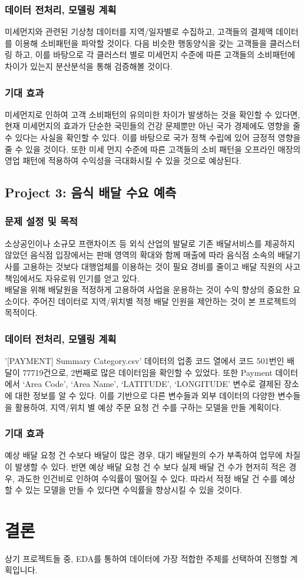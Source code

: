 \documentclass[11pt]{article}
\begin{document}
\subsubsection{데이터 전처리, 모델링 계획}
미세먼지와 관련된 기상청 데이터를 지역/일자별로 수집하고, 고객들의 결제액 데이터를 이용해 소비패턴을 파악할 것이다. 다음 비슷한 행동양식을 갖는 고객들을 클러스터링 하고, 이를 바탕으로 각 클러스터 별로 미세먼지 수준에 따른 고객들의 소비패턴에 차이가 있는지 분산분석을 통해 검증해볼 것이다.
\subsubsection{기대 효과}
미세먼지로 인하여 고객 소비패턴의 유의미한 차이가 발생하는 것을 확인할 수 있다면, 현재 미세먼지의 효과가 단순한 국민들의 건강 문제뿐만 아닌 국가 경제에도 영향을 줄 수 있다는 사실을 확인할 수 있다. 이를 바탕으로 국가 정책 수립에 있어 긍정적 영향을 줄 수 있을 것이다.
또한 미세 먼지 수준에 따른 고객들의 소비 패턴을 오프라인 매장의 영업 패턴에 적용하여 수익성을 극대화시킬 수 있을 것으로 예상된다.

\subsection{Project 3: 음식 배달 수요 예측}
\subsubsection{문제 설정 및 목적}
소상공인이나 소규모 프랜차이즈 등 외식 산업의 발달로 기존 배달서비스를 제공하지 않았던 음식점 입장에서는 판매 영역의 확대와 함께 매출에 따라 음식점 소속의 배달기사를 고용하는 것보다 대행업체를 이용하는 것이 필요 경비를 줄이고 배달 직원의 사고 책임에서도 자유로워 인기를 얻고 있다.\\
배달을 위해 배달원을 적정하게 고용하여 사업을 운용하는 것이 수익 향상의 중요한 요소이다. 주어진 데이터로 지역/위치별 적정 배달 인원을 제안하는 것이 본 프로젝트의 목적이다.
\subsubsection{데이터 전처리, 모델링 계획}
'[PAYMENT] Summary Category.csv’ 데이터의 업종 코드 열에서 코드 501번인 배달이 77719건으로, 2번째로 많은 데이터임을 확인할 수 있었다. 또한 Payment 데이터에서 ‘Area Code’, ‘Area Name’, ‘LATITUDE’, ‘LONGITUDE’ 변수로 결제된 장소에 대한 정보를 알 수 있다. 이를 기반으로 다른 변수들과 외부 데이터의 다양한 변수들을 활용하여, 지역/위치 별 예상 주문 요청 건 수를 구하는 모델을 만들 계획이다.
\subsubsection{기대 효과}
예상 배달 요청 건 수보다 배달이 많은 경우, 대기 배달원의 수가 부족하여 업무에 차질이 발생할 수 있다. 반면 예상 배달 요청 건 수 보다 실제 배달 건 수가 현저히 적은 경우, 과도한 인건비로 인하여 수익률이 떨어질 수 있다. 따라서 적정 배달 건 수를 예상할 수 있는 모델을 만들 수 있다면 수익률을 향상시킬 수 있을 것이다.

\section{결론}
상기 프로젝트들 중, EDA를 통하여 데이터에 가장 적합한 주제를 선택하여 진행할 계획입니다.
\end{document}
